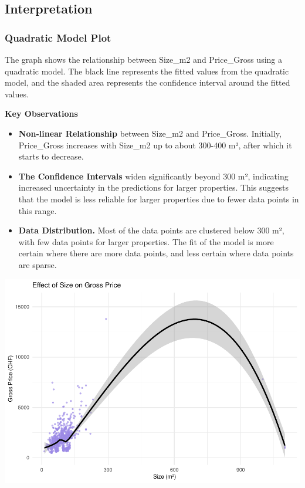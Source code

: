 \documentclass[
]{article}
\begin{document}
\subsection{Interpretation}\label{interpretation-3}

\subsubsection{Quadratic Model Plot}\label{quadratic-model-plot}

The graph shows the relationship between Size\_m2 and Price\_Gross using
a quadratic model. The black line represents the fitted values from the
quadratic model, and the shaded area represents the confidence interval
around the fitted values.

\textbf{Key Observations}

\begin{itemize}
\item
  \textbf{Non-linear Relationship} between Size\_m2 and Price\_Gross.
  Initially, Price\_Gross increases with Size\_m2 up to about 300-400
  m², after which it starts to decrease.
\item
  \textbf{The Confidence Intervals} widen significantly beyond 300 m²,
  indicating increased uncertainty in the predictions for larger
  properties. This suggests that the model is less reliable for larger
  properties due to fewer data points in this range.
\item
  \textbf{Data Distribution.} Most of the data points are clustered
  below 300 m², with few data points for larger properties. The fit of
  the model is more certain where there are more data points, and less
  certain where data points are sparse.
\end{itemize}

\includegraphics{2024_groupXX_report_files/figure-latex/GAM code 1 -1.pdf}
\end{document}
